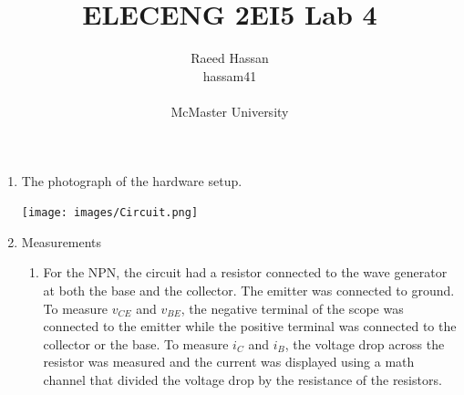 \documentclass[12pt]{article}
\title{ELECENG 2EI5 Lab 4}
\author{Raeed Hassan \\ hassam41 \\  \\ McMaster University}
\begin{document}
\maketitle
\pagebreak

\begin{enumerate}
    \item The photograph of the hardware setup.
    \begin{center}
        \texttt{[image: images/Circuit.png]}
    \end{center}
    \item Measurements
    \begin{enumerate}
        \item For the NPN, the circuit had a resistor connected to the wave generator at both the base and the collector. The emitter was connected to ground. To measure $v_{CE}$ and $v_{BE}$, the negative terminal of the scope was connected to the emitter while the positive terminal was connected to the collector or the base. To measure $i_C$ and $i_B$, the voltage drop across the resistor was measured and the current was displayed using a math channel that divided the voltage drop by the resistance of the resistors.
        

\end{enumerate}
\end{enumerate}
\end{document}
